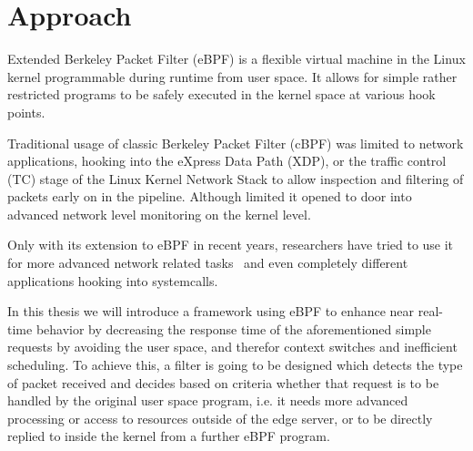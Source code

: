 \section{Approach}


Extended Berkeley Packet Filter (eBPF) is a flexible virtual machine in the
Linux kernel programmable during runtime from user space. It allows for simple
rather restricted programs to be safely executed in the kernel space at various
hook points.


Traditional usage of classic Berkeley Packet Filter (cBPF) was limited to
network applications, hooking into the eXpress Data Path (XDP), or the traffic
control (TC) stage of the Linux Kernel Network Stack to allow inspection and
filtering of packets early on in the pipeline. Although limited it opened to
door into advanced network level monitoring on the kernel level.

Only with its extension to eBPF in recent years, researchers have tried to use
it for more advanced network related tasks~\cite{miano_creating_2018} and even
completely different applications hooking into systemcalls.


In this thesis we will introduce a framework using eBPF to enhance near
real-time behavior by decreasing the response time of the aforementioned simple
requests by avoiding the user space, and therefor context switches and
inefficient scheduling. To achieve this, a filter is going to be designed which
detects the type of packet received and decides based on criteria whether that
request is to be handled by the original user space program, i.e. it needs more
advanced processing or access to resources outside of the edge server, or to be
directly replied to inside the kernel from a further eBPF program.
